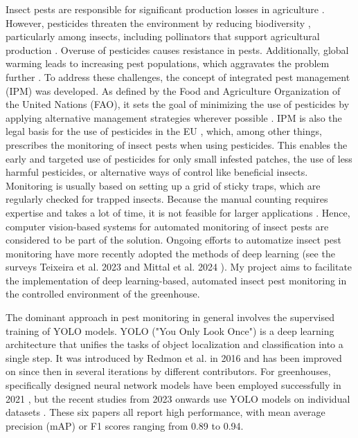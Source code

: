\documentclass[12pt,a4paper]{article}
\begin{document}
Insect pests are responsible for significant production losses in agriculture \cite{climate}. However, pesticides threaten the environment by reducing biodiversity \cite{mamy:hal-03777257}, particularly among insects, including pollinators that support agricultural production \cite{Smith2022PollinatorDeficits}. Overuse of pesticides causes resistance in pests. Additionally, global warming leads to increasing pest populations, which aggravates the problem further \cite{climate}. To address these challenges, the concept of integrated pest management (IPM) was developed. As defined by the Food and Agriculture Organization of the United Nations (FAO), it sets the goal of minimizing the use of pesticides by applying alternative management strategies wherever possible \cite{IPM_FAO, IPM_book}. %
IPM is also the legal basis for the use of pesticides in the EU \cite{IPM_EU}, which, among other things, prescribes the monitoring of insect pests when using pesticides. This enables the early and targeted use of pesticides for only small infested patches, the use of less harmful pesticides, or alternative ways of control like beneficial insects. Monitoring is usually based on setting up a grid of sticky traps, which are regularly checked for trapped insects. Because the manual counting requires expertise and takes a lot of time, it is not feasible for larger applications \cite{survey2022}. Hence, computer vision-based systems for automated monitoring of insect pests are considered to be part of the solution. Ongoing efforts to automatize insect pest monitoring have more recently adopted the methods of deep learning (see the surveys Teixeira et al. 2023 \cite{survey2023} and Mittal et al. 2024 \cite{survey2024b}). 
My project aims to facilitate the implementation of deep learning-based, automated insect pest monitoring in the controlled environment of the greenhouse.

The dominant approach in pest monitoring in general involves the supervised training of YOLO models. YOLO ("You Only Look Once") is a deep learning architecture that unifies the tasks of object localization and classification into a single step. It was introduced by Redmon et al. in 2016 \cite{redmon2016you} and has been improved on since then in several iterations by different contributors. For greenhouses, specifically designed neural network models have been employed successfully in 2021 \cite{rustia_automatic_2021, li_field_2021}, but the recent studies from 2023 onwards use YOLO models on individual datasets \cite{costa_intelligent_2023, zhang_automatic_2023, wang_deep-learning-based_2024, shi_small_2025}. These six papers all report high performance, with mean average precision (mAP) or F1 scores ranging from 0.89 to 0.94.
\end{document}
